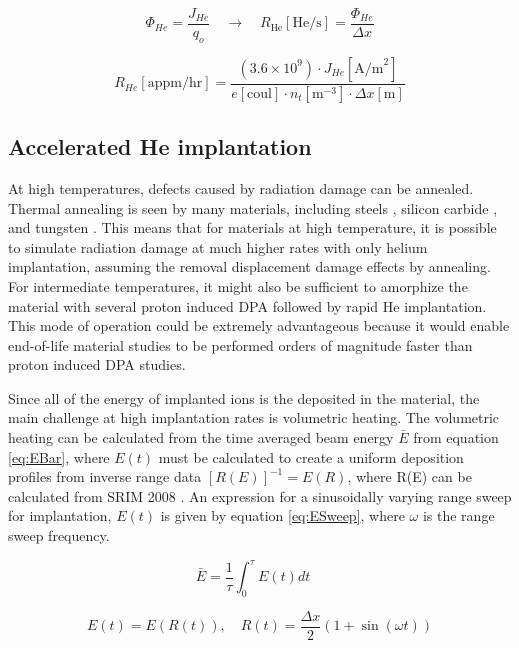 \documentclass[final,3p,times,twocolumn]{elsarticle} %
\begin{document}
\begin{equation}
\Phi_{He} = \frac{J_{He}}{q_o} \quad \longrightarrow \quad R_{\mathrm{He}} [\mathrm{He/s}] = \frac{\Phi_{He}}{\Delta x}
\label{eq:HeRate1}
\end{equation}

\begin{equation}
R_{He} [\mathrm{appm/hr}] = \frac{(3.6\times 10^9)\cdot J_{He}[\mathrm{A/m}^2]} {e[\mathrm{coul}]\cdot n_t[\mathrm{m}^{-3}]\cdot \Delta x [\mathrm{m}]}
\label{eq:HeRate2}
\end{equation}

\subsection{Accelerated He implantation}
At high temperatures, defects caused by radiation damage can be annealed.  Thermal annealing is seen by many materials, including steels \cite{KluehTwo}, silicon carbide \cite{SneadZinkleTwo}, and tungsten \cite{Lassner}.  This means that for materials at high temperature, it is possible to simulate radiation damage at much higher rates with only helium implantation, assuming the removal displacement damage effects by annealing.  For intermediate temperatures, it might also be sufficient to amorphize the material with several proton induced DPA followed by rapid He implantation.  This mode of operation could be extremely advantageous because it would enable end-of-life material studies to be performed orders of magnitude faster than proton induced DPA studies. 

Since all of the energy of implanted ions is the deposited in the material, the main challenge at high implantation rates is volumetric heating.  The volumetric heating can be calculated from the time averaged beam energy $\bar{E}$ from equation \ref{eq:EBar}, where $E(t)$ must be calculated to create a uniform deposition profiles from inverse range data $[R(E)]^{-1} = E(R)$, where R(E) can be calculated from SRIM 2008 \cite{SRIM}.  An expression for a sinusoidally varying range sweep for implantation, $E(t)$ is given by equation \ref{eq:ESweep}, where $\omega$ is the range sweep frequency.

\begin{equation}
\bar{E} = \frac{1}{\tau}\int_0^\tau E(t)dt \quad
\label{eq:EBar}
\end{equation}

\begin{equation}
E(t) = E(R(t)) , \quad R(t) = \frac{\Delta x}{2} (1 +\sin(\omega t))
\label{eq:ESweep}
\end{equation}
\end{document}
